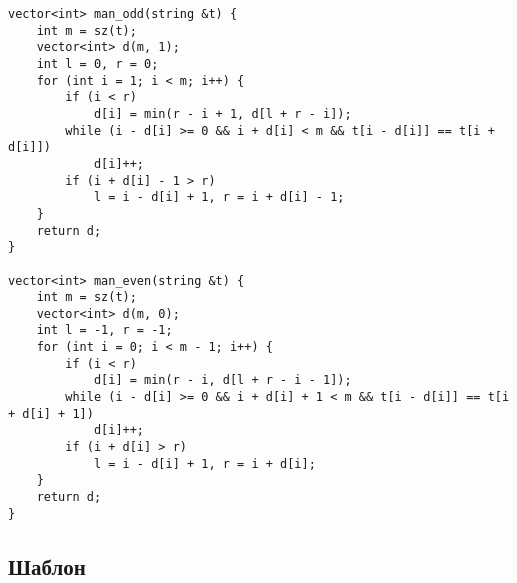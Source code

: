 \documentclass{article}
\begin{document}
    \begin{verbatim}
vector<int> man_odd(string &t) {
    int m = sz(t);
    vector<int> d(m, 1);
    int l = 0, r = 0;
    for (int i = 1; i < m; i++) {
        if (i < r)
            d[i] = min(r - i + 1, d[l + r - i]);
        while (i - d[i] >= 0 && i + d[i] < m && t[i - d[i]] == t[i + d[i]])
            d[i]++;
        if (i + d[i] - 1 > r)
            l = i - d[i] + 1, r = i + d[i] - 1;
    }
    return d;
}

vector<int> man_even(string &t) {
    int m = sz(t);
    vector<int> d(m, 0);
    int l = -1, r = -1;
    for (int i = 0; i < m - 1; i++) {
        if (i < r)
            d[i] = min(r - i, d[l + r - i - 1]);
        while (i - d[i] >= 0 && i + d[i] + 1 < m && t[i - d[i]] == t[i + d[i] + 1])
            d[i]++;
        if (i + d[i] > r)
            l = i - d[i] + 1, r = i + d[i];
    }
    return d;
}
    \end{verbatim}   

    \subsection{Шаблон}
\end{document}
